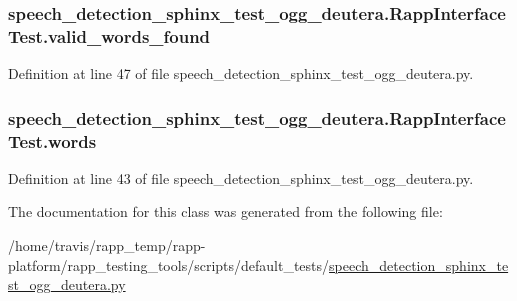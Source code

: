 \hypertarget{classspeech__detection__sphinx__test__ogg__deutera_1_1RappInterfaceTest_ad94b8f879ac28451caecb43b85a87f26}{
\subsubsection[{valid\-\_\-words\-\_\-found}]{\setlength{\rightskip}{0pt plus 5cm}speech\-\_\-detection\-\_\-sphinx\-\_\-test\-\_\-ogg\-\_\-deutera.\-Rapp\-Interface\-Test.\-valid\-\_\-words\-\_\-found}}\label{classspeech__detection__sphinx__test__ogg__deutera_1_1RappInterfaceTest_ad94b8f879ac28451caecb43b85a87f26}


Definition at line 47 of file speech\-\_\-detection\-\_\-sphinx\-\_\-test\-\_\-ogg\-\_\-deutera.\-py.

\hypertarget{classspeech__detection__sphinx__test__ogg__deutera_1_1RappInterfaceTest_af669927ced20b9af9c26cc4e42d6a7c4}{
\subsubsection[{words}]{\setlength{\rightskip}{0pt plus 5cm}speech\-\_\-detection\-\_\-sphinx\-\_\-test\-\_\-ogg\-\_\-deutera.\-Rapp\-Interface\-Test.\-words}}\label{classspeech__detection__sphinx__test__ogg__deutera_1_1RappInterfaceTest_af669927ced20b9af9c26cc4e42d6a7c4}


Definition at line 43 of file speech\-\_\-detection\-\_\-sphinx\-\_\-test\-\_\-ogg\-\_\-deutera.\-py.



The documentation for this class was generated from the following file\-:\begin{DoxyCompactItemize}
\item 
/home/travis/rapp\-\_\-temp/rapp-\/platform/rapp\-\_\-testing\-\_\-tools/scripts/default\-\_\-tests/\hyperlink{speech__detection__sphinx__test__ogg__deutera_8py}{speech\-\_\-detection\-\_\-sphinx\-\_\-test\-\_\-ogg\-\_\-deutera.\-py}\end{DoxyCompactItemize}
